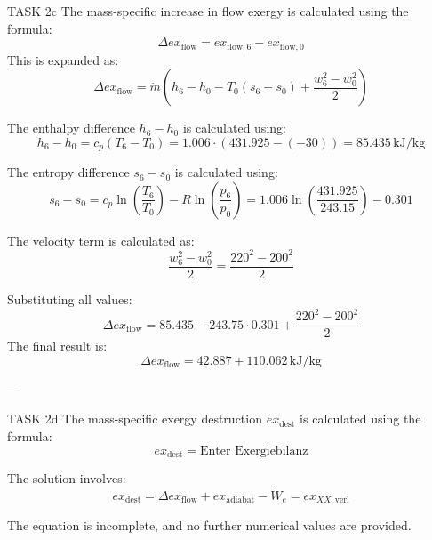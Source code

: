 TASK 2c  
The mass-specific increase in flow exergy is calculated using the formula:  
\[
\Delta ex_{\text{flow}} = ex_{\text{flow},6} - ex_{\text{flow},0}
\]  
This is expanded as:  
\[
\Delta ex_{\text{flow}} = \dot{m} \left( h_6 - h_0 - T_0 (s_6 - s_0) + \frac{w_6^2 - w_0^2}{2} \right)
\]  

The enthalpy difference \( h_6 - h_0 \) is calculated using:  
\[
h_6 - h_0 = c_p (T_6 - T_0) = 1.006 \cdot (431.925 - (-30)) = 85.435 \, \text{kJ/kg}
\]  

The entropy difference \( s_6 - s_0 \) is calculated using:  
\[
s_6 - s_0 = c_p \ln \left( \frac{T_6}{T_0} \right) - R \ln \left( \frac{p_6}{p_0} \right) = 1.006 \ln \left( \frac{431.925}{243.15} \right) - 0.301
\]  

The velocity term is calculated as:  
\[
\frac{w_6^2 - w_0^2}{2} = \frac{220^2 - 200^2}{2}
\]  

Substituting all values:  
\[
\Delta ex_{\text{flow}} = 85.435 - 243.75 \cdot 0.301 + \frac{220^2 - 200^2}{2}
\]  
The final result is:  
\[
\Delta ex_{\text{flow}} = 42.887 + 110.062 \, \text{kJ/kg}
\]  

---

TASK 2d  
The mass-specific exergy destruction \( ex_{\text{dest}} \) is calculated using the formula:  
\[
ex_{\text{dest}} = \text{Enter Exergiebilanz}
\]  

The solution involves:  
\[
ex_{\text{dest}} = \Delta ex_{\text{flow}} + ex_{\text{adiabat}} - \dot{W}_e = ex_{XX,\text{verl}}
\]  

The equation is incomplete, and no further numerical values are provided.